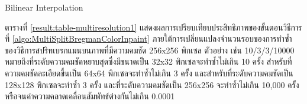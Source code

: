 \begin{algorithm}[H]
    \caption{Bilinear Interpolation}
    \SetAlgoNoLine
\end{algorithm}\hspace{1cm} ตารางที่ \ref{result:table-multiresolution1} แสดงผลการเปรียบเทียบประสิทธิภาพของขั้นตอนวิธีการที่ \ref{algo:MultiSplitBregmanColorInpaint} ภายใต้การเปลี่ยนแปลงจำนวนรอบของการทำซ้ำของวิธีการสปริทเบรกแมนบนภาพที่มีความคมชัด 256x256 พิกเซล ตัวอย่าง เช่น 10/3/3/10000 หมายถึงที่ระดับความคมชัดหยาบสุดซึ่งมีขนาดเป็น 32x32 พิกเซลจะทำซ้ำไม่เกิน 10 ครั้ง สำหรับที่ความคมชัดละเอียดขึ้นเป็น 64x64 พิกเซลจะทำซ้ำไม่เกิน 3 ครั้ง และสำหรับที่ระดับความคมชัดเป็น 128x128 พิกเซลจะทำซ้ำ 3 ครั้ง และที่ระดับความคมชัดเป็น 256x256 จะทำซ้ำไม่เกิน 10,000 ครั้งหรือจนค่าความคลาดเคลื่อนสัมพัทธ์ต่างกันไม่เกิน 0.0001 
	
